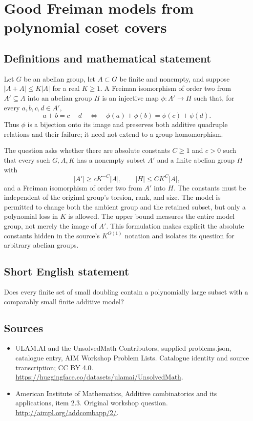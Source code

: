 \documentclass[11pt,a4paper]{article}
\begin{document}
\section*{Good Freiman models from polynomial coset covers}\label{statement}

\subsection{Definitions and mathematical statement}
Let $G$ be an abelian group, let $A\subset G$ be finite and nonempty, and suppose $|A+A|\leq K|A|$ for a real $K\geq1$.
A Freiman isomorphism of order two from $A'\subseteq A$ into an abelian group $H$ is an injective map $\phi:A'\to H$ such that, for every $a,b,c,d\in A'$,
\[
 a+b=c+d\quad\Longleftrightarrow\quad
 \phi(a)+\phi(b)=\phi(c)+\phi(d).
\]
Thus $\phi$ is a bijection onto its image and preserves both additive quadruple relations and their failure; it need not extend to a group homomorphism.

The question asks whether there are absolute constants $C\geq1$ and $c>0$ such that every such $G,A,K$ has a nonempty subset $A'$ and a finite abelian group $H$ with
\[
 |A'|\geq cK^{-C}|A|,\qquad
 |H|\leq CK^C|A|,
\]
and a Freiman isomorphism of order two from $A'$ into $H$.
The constants must be independent of the original group's torsion, rank, and size.
The model is permitted to change both the ambient group and the retained subset, but only a polynomial loss in $K$ is allowed.
The upper bound measures the entire model group, not merely the image of $A'$.
This formulation makes explicit the absolute constants hidden in the source's $K^{O(1)}$ notation and isolates its question for arbitrary abelian groups.
\subsection{Short English statement}
Does every finite set of small doubling contain a polynomially large subset with a comparably small finite additive model?
\subsection{Sources}
\begin{itemize}
\item[S1] ULAM.AI and the UnsolvedMath Contributors, supplied problems.json, catalogue entry, AIM Workshop Problem Lists. Catalogue identity and source transcription; CC BY 4.0.
\url{https://huggingface.co/datasets/ulamai/UnsolvedMath}.
\item[S2] American Institute of Mathematics, Additive combinatorics and its applications, item 2.3. Original workshop question.
\url{http://aimpl.org/addcombapp/2/}.
\end{itemize}
\end{document}
